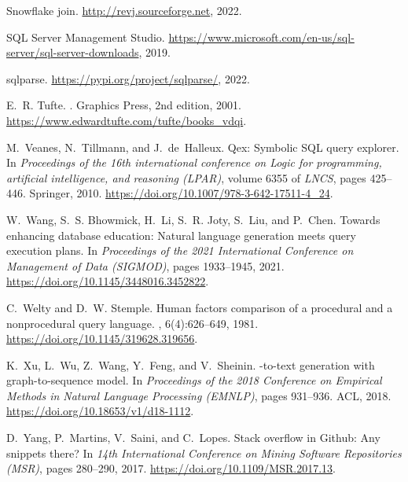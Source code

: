 \documentclass[letterpaper,11pt]{article}
\begin{document}
\begin{thebibliography}{100}
{Snowflake join}.
\newblock \url{http://revj.sourceforge.net}, 2022.

{SQL Server Management Studio}.
\newblock
  \url{https://www.microsoft.com/en-us/sql-server/sql-server-downloads}, 2019.

{sqlparse}.
\newblock \url{https://pypi.org/project/sqlparse/}, 2022.

E.~R. Tufte.
.
\newblock Graphics Press, 2nd edition, 2001.
\newblock \url{https://www.edwardtufte.com/tufte/books_vdqi}.

M.~Veanes, N.~Tillmann, and J.~de~Halleux.
\newblock Qex: Symbolic {SQL} query explorer.
\newblock In {\em Proceedings of the 16th international conference on Logic for
  programming, artificial intelligence, and reasoning (LPAR)}, volume 6355 of
  {\em LNCS}, pages 425--446. Springer, 2010.
\newblock \url{https://doi.org/10.1007/978-3-642-17511-4\_24}.

W.~Wang, S.~S. Bhowmick, H.~Li, S.~R. Joty, S.~Liu, and P.~Chen.
\newblock Towards enhancing database education: Natural language generation
  meets query execution plans.
\newblock In {\em Proceedings of the 2021 International Conference on
  Management of Data ({SIGMOD})}, pages 1933--1945, 2021.
\newblock \url{https://doi.org/10.1145/3448016.3452822}.

C.~Welty and D.~W. Stemple.
\newblock Human factors comparison of a procedural and a nonprocedural query
  language.
, 6(4):626--649,
  1981.
\newblock \url{https://doi.org/10.1145/319628.319656}.

K.~Xu, L.~Wu, Z.~Wang, Y.~Feng, and V.~Sheinin.
-to-text generation with graph-to-sequence model.
\newblock In {\em Proceedings of the 2018 Conference on Empirical Methods in
  Natural Language Processing ({EMNLP})}, pages 931--936. ACL, 2018.
\newblock \url{https://doi.org/10.18653/v1/d18-1112}.

D.~Yang, P.~Martins, V.~Saini, and C.~Lopes.
\newblock Stack overflow in {Github}: Any snippets there?
\newblock In {\em 14th International Conference on Mining Software Repositories
  (MSR)}, pages 280--290, 2017.
\newblock \url{https://doi.org/10.1109/MSR.2017.13}.


\end{thebibliography}
\end{document}
